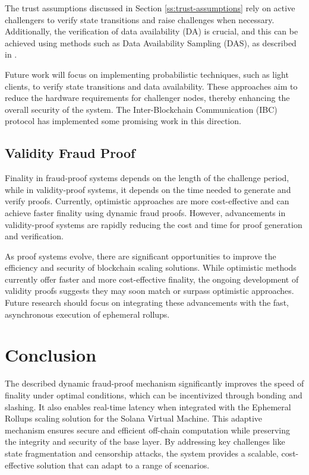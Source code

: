 \documentclass{article}
\begin{document}
The trust assumptions discussed in Section \ref{ss:trust-assumptions} rely on active challengers to verify state transitions and raise challenges when necessary. Additionally, the verification of data availability (DA) is crucial, and this can be achieved using methods such as Data Availability Sampling (DAS), as described in \cite{tiny}.

Future work will focus on implementing probabilistic techniques, such as light clients, to verify state transitions and data availability. These approaches aim to reduce the hardware requirements for challenger nodes, thereby enhancing the overall security of the system. The Inter-Blockchain Communication (IBC) protocol \cite{ibc2023} has implemented some promising work in this direction.

\subsection{Validity Fraud Proof}

Finality in fraud-proof systems depends on the length of the challenge period, while in validity-proof systems, it depends on the time needed to generate and verify proofs. Currently, optimistic approaches are more cost-effective and can achieve faster finality using dynamic fraud proofs. However, advancements in validity-proof systems are rapidly reducing the cost and time for proof generation and verification.

As proof systems evolve, there are significant opportunities to improve the efficiency and security of blockchain scaling solutions. While optimistic methods currently offer faster and more cost-effective finality, the ongoing development of validity proofs suggests they may soon match or surpass optimistic approaches. Future research should focus on integrating these advancements with the fast, asynchronous execution of ephemeral rollups.

\section{Conclusion}

The described dynamic fraud-proof mechanism significantly improves the speed of finality under optimal conditions, which can be incentivized through bonding and slashing. It also enables real-time latency when integrated with the Ephemeral Rollups scaling solution for the Solana Virtual Machine. This adaptive mechanism ensures secure and efficient off-chain computation while preserving the integrity and security of the base layer. By addressing key challenges like state fragmentation and censorship attacks, the system provides a scalable, cost-effective solution that can adapt to a range of scenarios.

\clearpage
\printbibliography
\end{document}
